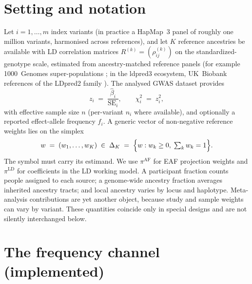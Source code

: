 \documentclass[11pt,a4paper]{article}
\newcommand{\simplex}{\Delta_{K}}
\newcommand{\Rk}{R^{(k)}}
\newcommand{\Rho}{\rho}
\begin{document}
\section{Setting and notation}\label{sec:setting}

Let $i = 1, \dots, m$ index variants (in practice a HapMap~3 panel
\citep{altshuler2010hapmap3} of roughly one million variants, harmonised
across references), and let $K$ reference ancestries be available with LD
correlation matrices $\Rk = (\Rho^{(k)}_{ij})$ on the standardized-genotype
scale, estimated from ancestry-matched reference panels (for example
1000~Genomes super-populations \citep{auton20151000g}; in the ldpred3
ecosystem, UK~Biobank references of the LDpred2 family
\citep{prive2020ldpred2}). The analysed GWAS dataset provides
\begin{equation}\label{eq:zdef}
  z_i \;=\; \frac{\hat\beta_i}{\mathrm{SE}_i},
  \qquad
  \chi^2_i \;=\; z_i^2,
\end{equation}
with effective sample size $n$ (per-variant $n_i$ where available), and
optionally a reported effect-allele frequency $f_i$. A generic vector of
non-negative reference weights lies on the simplex
\begin{equation}\label{eq:simplex}
  w \;=\; (w_1, \dots, w_K) \;\in\; \simplex
  \;=\; \Bigl\{ w : w_k \ge 0, \; \textstyle\sum_k w_k = 1 \Bigr\}.
\end{equation}
The symbol must carry its estimand. We use $\pi^{\mathrm{AF}}$ for EAF
projection weights and $\pi^{\mathrm{LD}}$ for coefficients in the LD
working model. A participant fraction counts people assigned to each
source; a genome-wide ancestry fraction averages inherited ancestry tracts;
and local ancestry varies by locus and haplotype. Meta-analysis
contributions are yet another object, because study and sample weights can
vary by variant. These quantities coincide only in special designs and are
not silently interchanged below.

\section{The frequency channel (implemented)}\label{sec:af}
\end{document}
